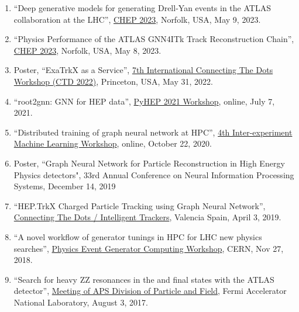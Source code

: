 \begin{enumerate}
    \item ``Deep generative models for generating Drell-Yan events in the ATLAS collaboration at the LHC'', \href{https://indico.jlab.org/event/459/contributions/11572/}{CHEP 2023}, Norfolk, USA, May 9, 2023.

    \item ``Physics Performance of the ATLAS GNN4ITk Track Reconstruction Chain'', \href{https://indico.jlab.org/event/459/contributions/11414/}{CHEP 2023}, Norfolk, USA, May 8, 2023.

    \item Poster, ``ExaTrkX as a Service'', \href{https://indico.cern.ch/event/1103637/contributions/4825740/}{7th International Connecting The Dots Workshop (CTD 2022)}, Princeton, USA, May 31, 2022.

    \item ``root2gnn: GNN for HEP data'', \href{https://indico.cern.ch/event/1019958/contributions/4419907/}{PyHEP 2021 Workshop}, online, July 7, 2021.

    \item ``Distributed training of graph neural network at HPC'', \href{https://indico.cern.ch/event/948465/contributions/4324130/}{4th Inter-experiment Machine Learning Workshop}, online, October 22, 2020.
    
    \item Poster, ``Graph Neural Network for Particle Reconstruction in High Energy Physics detectors", 33rd Annual Conference on Neural Information Processing Systems, December 14, 2019

    \item ``HEP.TrkX Charged Particle Tracking using Graph Neural Network'', \href{https://indico.cern.ch/event/742793/contributions/3274328/}{Connecting The Dots / Intelligent Trackers}, Valencia Spain, April 3, 2019.

    \item ``A novel workflow of generator tunings in HPC for LHC new physics searches'', \href{https://indico.cern.ch/event/751693/}{Physics Event Generator Computing Workshop}, CERN, Nov 27, 2018.
    
    \item ``Search for heavy ZZ resonances in the \llll and \llvv final states with the ATLAS detector'', \href{https://indico.fnal.gov/contributionDisplay.py?sessionId=14&contribId=98&confId=11999}{Meeting of APS Division of Particle and Field}, Fermi Accelerator National Laboratory, August 3, 2017.
    

\end{enumerate}
